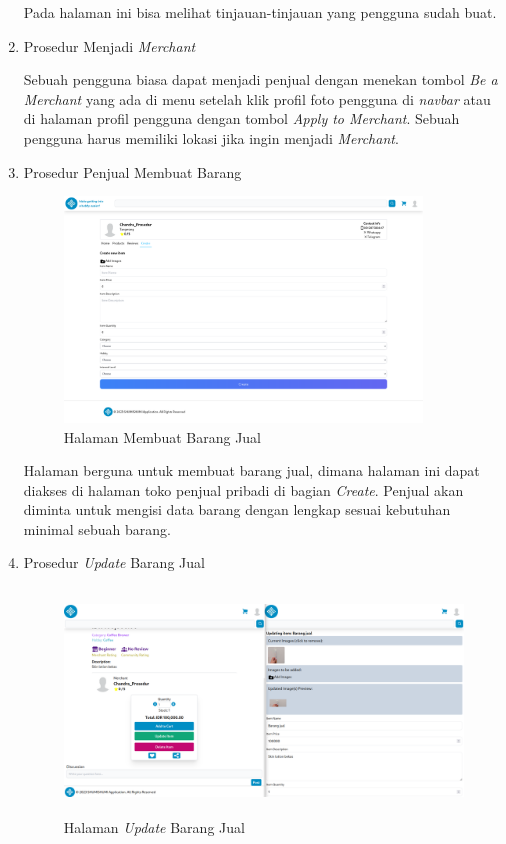 \documentclass[a4paper]{article}
\begin{document}
\begin{enumerate}
Pada halaman ini bisa melihat tinjauan-tinjauan yang pengguna sudah buat.

\item Prosedur Menjadi \textit{Merchant}

Sebuah pengguna biasa dapat menjadi penjual dengan menekan tombol \textit{Be a Merchant} yang ada di menu setelah klik profil foto pengguna di \textit{navbar} atau di halaman profil pengguna dengan tombol \textit{Apply to Merchant}. Sebuah pengguna harus memiliki lokasi jika ingin menjadi \textit{Merchant}.

\item Prosedur Penjual Membuat Barang

\begin{figure}[h]
    \centering
    \includegraphics*[height=6cm]{images/prosedur pengunaan aplikasi/Merchant/Create Item.png}
    \caption{Halaman Membuat Barang Jual}
\end{figure}

Halaman berguna untuk membuat barang jual, dimana halaman ini dapat diakses di halaman toko penjual pribadi di bagian \textit{Create}. Penjual akan diminta untuk mengisi data barang dengan lengkap sesuai kebutuhan minimal sebuah barang.

\item Prosedur \textit{Update} Barang Jual

\begin{figure}[h]
    \centering
    \includegraphics*[height=6cm]{images/prosedur pengunaan aplikasi/Merchant/Update Item.png}
    \caption{Halaman \textit{Update} Barang Jual}
\end{figure}


\end{enumerate}
\end{document}
